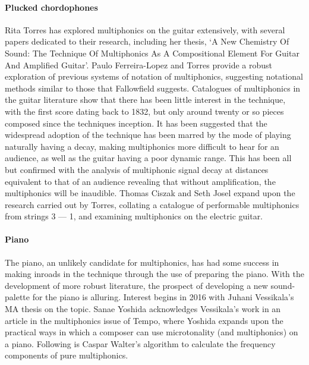 \paragraph{Plucked chordophones}
Rita Torres has explored multiphonics on the guitar extensively, with several papers dedicated to their research, including her thesis, `A New Chemistry Of Sound: The Technique Of Multiphonics As A Compositional Element For Guitar And Amplified Guitar'.\autocite{torresMultiphonicsCompositionalElement2012}
Paulo Ferreira-Lopez and Torres provide a robust exploration of previous systems of notation of multiphonics, suggesting notational methods similar to those that Fallowfield suggests.\autocite{ferreira-lopesGuitarMultiphonicsNotations}
Catalogues of multiphonics in the guitar literature show that there has been little interest in the technique, with the first score dating back to 1832, but only around twenty or so pieces composed since the techniques inception.\autocite[80--82]{torresSoundWorldGuitar2018}
It has been suggested that the widespread adoption of the technique has been marred by the mode of playing naturally having a decay, making multiphonics more difficult to hear for an audience, as well as the guitar having a poor dynamic range.\autocite[21--22]{Torres2014TowardsOT}
This has been all but confirmed with the analysis of multiphonic signal decay at distances equivalent to that of an audience revealing that without amplification, the multiphonics will be inaudible.\autocite[279]{torresGuitarMultiphonicsInfluence2014}
Thomas Ciszak and Seth Josel expand upon the research carried out by Torres, collating a catalogue of performable multiphonics from strings 3 --- 1, and examining multiphonics on the electric guitar.\autocite{ciszakNeonLightMultiphonic2020}

\paragraph{Piano}
The piano, an unlikely candidate for multiphonics, has had some success in making inroads in the technique through the use of preparing the piano.
With the development of more robust literature, the prospect of developing a new sound-palette for the piano is alluring.
Interest begins in 2016 with Juhani Vessikala's MA thesis on the topic.\autocite{vesikkalaMultiphonicsGrandPiano2016}
Sanae Yoshida acknowledges Vessikala's work in an article in the multiphonics issue of Tempo, where Yoshida expands upon the practical ways in which a composer can use microtonality (and multiphonics) on a piano.\autocite{yoshidaMicrotonalPianoTunedIn2020}
Following is Caspar Walter's algorithm to calculate the frequency components of pure multiphonics.\autocite{casparjohanneswalterVariantsContinuedFraction2019}